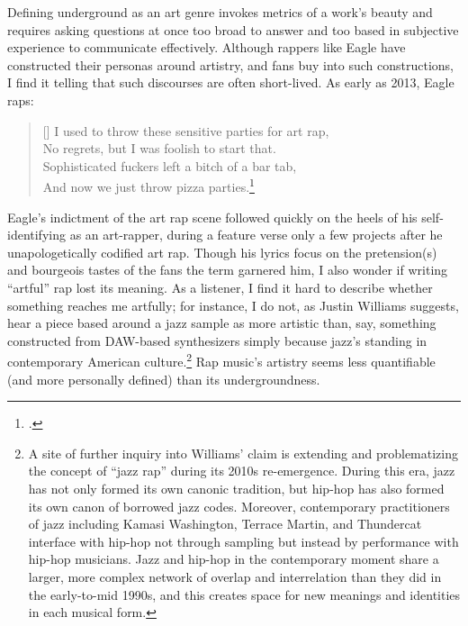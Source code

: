 Defining underground as an art genre invokes metrics of a work's beauty and requires asking
questions at once too broad to answer and too based in subjective experience to communicate
effectively. Although rappers like Eagle have constructed their personas around artistry, and 
fans buy into such constructions, I find it telling that such discourses are often short-lived.
As early as 2013, Eagle raps:
\settowidth{\versewidth}{I used to throw these sensitive parties for art rap,}
    \begin{verse}[\versewidth]
        I used to throw these sensitive parties for art rap, \\
        No regrets, but I was foolish to start that. \\
        Sophisticated fuckers left a bitch of a bar tab, \\
        And now we just throw pizza parties.\footnote{
        \cite{milo2013}.}
    \end{verse}
Eagle's indictment of the art rap scene followed quickly on the heels of his self-identifying
as an art-rapper, during a feature verse only a few projects after he unapologetically codified
art rap. Though his lyrics focus on the pretension(s) and bourgeois tastes of the fans
the term garnered him, I also  wonder if writing ``artful'' rap lost its meaning. As a listener,
I find it hard to describe whether something reaches me artfully; for instance, I do not, as
Justin Williams suggests, hear a piece based around a jazz sample as more artistic than, say,
something constructed from DAW-based synthesizers simply because jazz's standing in contemporary
American culture.\footnote{
    A site of further inquiry into Williams' claim is extending and problematizing the concept of 
    ``jazz rap'' during its 2010s re-emergence. During this era, jazz has not only formed its own
    canonic tradition, but hip-hop has also formed its own canon of borrowed jazz codes. Moreover,
    contemporary practitioners of jazz including Kamasi Washington, Terrace Martin, and Thundercat 
    interface with hip-hop not through sampling but instead by performance with hip-hop musicians.
    Jazz and hip-hop in the contemporary moment share a larger, more complex network of overlap and
    interrelation than they did in the early-to-mid 1990s, and this creates space for new meanings
    and identities in each musical form.}
Rap music's artistry seems less quantifiable (and more personally defined) than its undergroundness.

